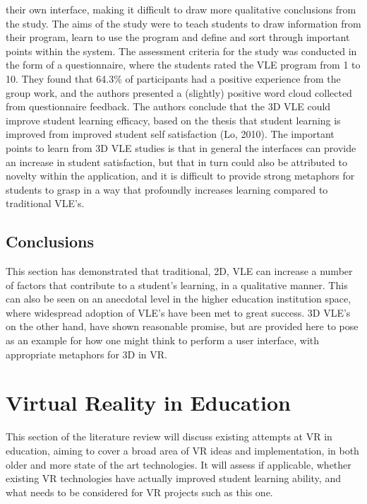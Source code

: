 \documentclass[11pt]{report}
\begin{document}
their own interface, making it difficult to draw more qualitative conclusions from the study. The aims of the study were to teach students to draw information from their program, learn to use the program and define and sort through important points within the system. The assessment criteria for the study was conducted in the form of a questionnaire, where the students rated the VLE program from 1 to 10. They found that 64.3\% of participants had a positive experience from the group work, and the authors presented a (slightly) positive word cloud collected from questionnaire feedback. The authors conclude that the 3D VLE could improve student learning efficacy, based on the thesis that student learning is improved from improved student self satisfaction (Lo, 2010). The important points to learn from 3D VLE studies is that in general the interfaces can provide an increase in student satisfaction, but that in turn could also be attributed to novelty within the application, and it is difficult to provide strong metaphors for students to grasp in a way that profoundly increases learning compared to traditional VLE's.
\subsection{Conclusions}
This section has demonstrated that traditional, 2D, VLE can increase a number of factors that contribute to a student's learning, in a qualitative manner. This can also be seen on an anecdotal level in the higher education institution space, where widespread adoption of VLE's have been met to great success. 3D VLE's on the other hand, have shown reasonable promise, but are provided here to pose as an example for how one might think to perform a user interface, with appropriate metaphors for 3D in VR. 
\section{Virtual Reality in Education}
This section of the literature review will discuss existing attempts at VR in education, aiming to cover a broad area of VR ideas and implementation, in both older and more state of the art technologies. It will assess if applicable, whether existing VR technologies have actually improved student learning ability, and what needs to be considered for VR projects such as this one.
\end{document}
